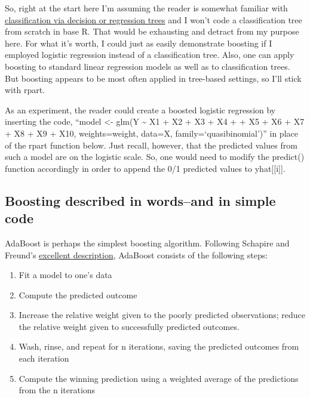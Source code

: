 \documentclass[]{tufte-handout}
\providecommand{\tightlist}{%
  \setlength{\itemsep}{0pt}\setlength{\parskip}{0pt}}
\begin{document}
So, right at the start here I'm assuming the reader is somewhat familiar
with
\href{https://www.amazon.com/Classification-Regression-Wadsworth-Statistics-Probability/dp/0412048418}{classification
via decision or regression trees} and I won't code a classification tree
from scratch in base R. That would be exhausting and detract from my
purpose here. For what it's worth, I could just as easily demonstrate
boosting if I employed logistic regression instead of a classification
tree. Also, one can apply boosting to standard linear regression models
as well as to classification trees. But boosting appears to be most
often applied in tree-based settings, so I'll stick with rpart.

\begin{marginfigure}
As an experiment, the reader could create a boosted logistic regression
by inserting the code, ``model \textless{}- glm(Y \textasciitilde{} X1 +
X2 + X3 + X4 + + X5 + X6 + X7 + X8 + X9 + X10, weights=weight, data=X,
family=`quasibinomial')'' in place of the rpart function below. Just
recall, however, that the predicted values from such a model are on the
logistic scale. So, one would need to modify the predict() function
accordingly in order to append the 0/1 predicted values to
yhat{[}{[}i{]}{]}.
\end{marginfigure}

\subsection{Boosting described in words--and in simple
code}\label{boosting-described-in-wordsand-in-simple-code}

AdaBoost is perhaps the simplest boosting algorithm. Following Schapire
and Freund's
\href{https://www.amazon.com/Boosting-Foundations-Algorithms-Adaptive-Computation/dp/0262526034}{excellent
description}, AdaBoost consists of the following steps:

\begin{enumerate}
\def\labelenumi{\arabic{enumi}.}
\tightlist
\item
  Fit a model to one's data
\item
  Compute the predicted outcome
\item
  Increase the relative weight given to the poorly predicted
  observations; reduce the relative weight given to successfully
  predicted outcomes.
\item
  Wash, rinse, and repeat for n iterations, saving the predicted
  outcomes from each iteration
\item
  Compute the winning prediction using a weighted average of the
  predictions from the n iterations
\end{enumerate}
\end{document}
